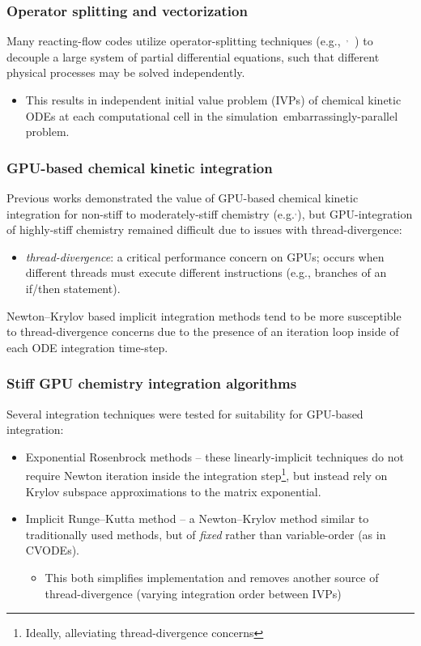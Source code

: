 \documentclass{beamer}
\begin{document}
\begin{frame}
 \frametitle{Operator splitting and vectorization}
 Many reacting-flow codes utilize operator-splitting techniques (e.g.,~$^{,}$~) to decouple a large system of partial differential equations, such that different physical processes may be solved independently.
 \begin{itemize}
  \item This results in independent initial value problem (IVPs) of chemical kinetic ODEs at each computational cell in the simulation\textrightarrow~embarrassingly-parallel problem.
 \end{itemize}
\end{frame}

\begin{frame}
 \frametitle{GPU-based chemical kinetic integration}
 Previous works demonstrated the value of GPU-based chemical kinetic integration for non-stiff to moderately-stiff chemistry (e.g.$^,$), but GPU-integration of highly-stiff chemistry remained difficult due to issues with thread-divergence:
 \begin{itemize}
  \item \textit{thread-divergence}: a critical performance concern on GPUs; occurs when different threads must execute different instructions (e.g., branches of an if\slash then statement).
 \end{itemize}
 Newton--Krylov based implicit integration methods tend to be more susceptible to thread-divergence concerns due to the presence of an iteration loop inside of each ODE integration time-step.
\end{frame}

\begin{frame}
 \frametitle{Stiff GPU chemistry integration algorithms}
 Several integration techniques were tested for suitability for GPU-based integration:
 \begin{itemize}
  \item Exponential Rosenbrock methods -- these linearly-implicit techniques do not require Newton iteration inside the integration step\footnote{Ideally, alleviating thread-divergence concerns}, but instead rely on Krylov subspace approximations to the matrix exponential.
  \item Implicit Runge--Kutta method -- a Newton--Krylov method similar to traditionally used methods, but of \textit{fixed} rather than variable-order (as in CVODEs).
  \begin{itemize}
   \item[\textrightarrow] This both simplifies implementation and removes another source of thread-divergence (varying integration order between IVPs)
  \end{itemize}
 \end{itemize}
\end{frame}
\end{document}

